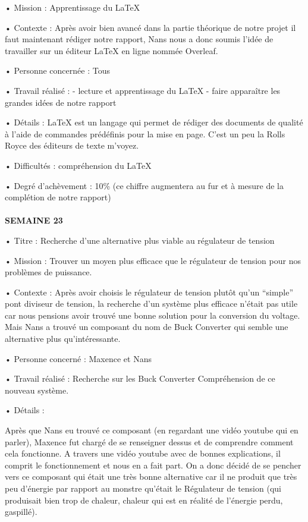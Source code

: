 \documentclass{PackagerQualityN}
\begin{document}
• Mission : Apprentissage du LaTeX

• Contexte : Après avoir bien avancé dans la partie théorique de notre projet il faut maintenant rédiger notre rapport, Nans nous a donc soumis l’idée de travailler sur un éditeur LaTeX en ligne nommée Overleaf.

• Personne concernée : Tous

• Travail réalisé :
- lecture et apprentissage du LaTeX
- faire apparaître les grandes idées de notre rapport

• Détails : 
LaTeX est un langage qui permet de rédiger des documents de qualité à l’aide de commandes prédéfinis pour la mise en page. C’est un peu la Rolls Royce des éditeurs de texte m’voyez.

• Difficultés :
compréhension du LaTeX


• Degré d’achèvement : 10\% (ce chiffre augmentera au fur et à mesure de la complétion de notre rapport)
\\\\
\textbf{SEMAINE 23}

• Titre : Recherche d’une alternative plus viable au régulateur de tension

• Mission : Trouver un moyen plus efficace que le régulateur de tension pour nos problèmes de puissance.

• Contexte :  Après avoir choisis le régulateur de tension plutôt qu’un “simple” pont diviseur de tension, la recherche d’un système plus efficace n’était pas utile car nous pensions avoir trouvé une bonne solution pour la conversion du voltage. Mais Nans a trouvé un composant du nom de Buck Converter qui semble une alternative plus qu’intéressante.

• Personne concerné : Maxence et Nans

• Travail réalisé :
Recherche sur les Buck Converter
Compréhension de ce nouveau système.

• Détails : 

Après que Nans eu trouvé ce composant (en regardant une vidéo youtube qui en parler), Maxence fut chargé de se renseigner dessus et de comprendre comment cela fonctionne. A travers une vidéo youtube avec de bonnes explications, il comprit le fonctionnement et nous en a fait part. On a donc décidé de se pencher vers ce composant qui était une très bonne alternative car il ne produit que très peu d’énergie par rapport au monstre qu’était le Régulateur de tension (qui produisait bien trop de chaleur, chaleur qui est en réalité de l’énergie perdu, gaspillé).
\end{document}

